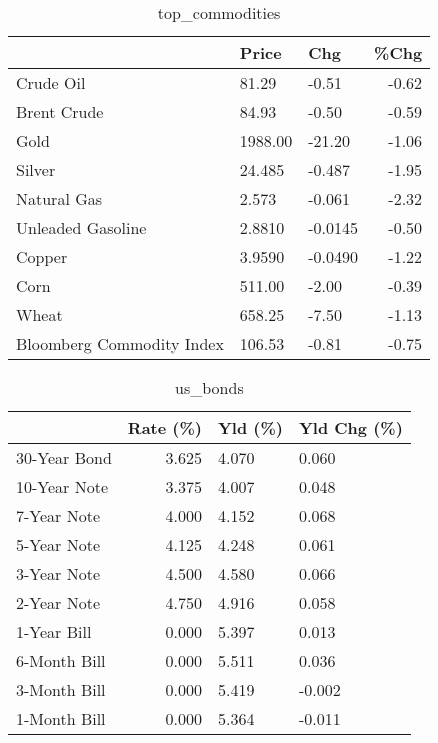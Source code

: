 \documentclass{article}%
\begin{document}
\begin{table}[htbp]%
\caption{top\_commodities}%
\centering%
\begin{adjustbox}{width=1\textwidth}%
\begin{tabular}{lllr}
\toprule
                          &   Price &     Chg &  \%Chg \\
\midrule
               Crude Oil  &   81.29 &   -0.51 & -0.62 \\
             Brent Crude  &   84.93 &   -0.50 & -0.59 \\
                    Gold  & 1988.00 &  -21.20 & -1.06 \\
                  Silver  &  24.485 &  -0.487 & -1.95 \\
             Natural Gas  &   2.573 &  -0.061 & -2.32 \\
       Unleaded Gasoline  &  2.8810 & -0.0145 & -0.50 \\
                  Copper  &  3.9590 & -0.0490 & -1.22 \\
                    Corn  &  511.00 &   -2.00 & -0.39 \\
                   Wheat  &  658.25 &   -7.50 & -1.13 \\
Bloomberg Commodity Index &  106.53 &   -0.81 & -0.75 \\
\bottomrule
\end{tabular}
%
\end{adjustbox}%
\end{table}

%


\begin{table}[htbp]%
\caption{us\_bonds}%
\centering%
\begin{adjustbox}{width=1\textwidth}%
\begin{tabular}{lrll}
\toprule
             &  Rate (\%) & Yld (\%) & Yld Chg (\%) \\
\midrule
30-Year Bond &     3.625 &   4.070 &       0.060 \\
10-Year Note &     3.375 &   4.007 &       0.048 \\
 7-Year Note &     4.000 &   4.152 &       0.068 \\
 5-Year Note &     4.125 &   4.248 &       0.061 \\
 3-Year Note &     4.500 &   4.580 &       0.066 \\
 2-Year Note &     4.750 &   4.916 &       0.058 \\
 1-Year Bill &     0.000 &   5.397 &       0.013 \\
6-Month Bill &     0.000 &   5.511 &       0.036 \\
3-Month Bill &     0.000 &   5.419 &      -0.002 \\
1-Month Bill &     0.000 &   5.364 &      -0.011 \\
\bottomrule
\end{tabular}
%
\end{adjustbox}%
\end{table}
\end{document}
